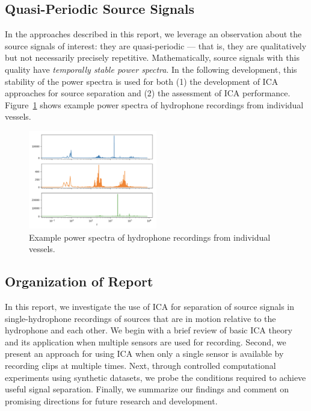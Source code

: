\documentclass[10pt]{article}
\begin{document}
\subsection*{Quasi-Periodic Source Signals}
In the approaches described in this report, we leverage an observation about the source
signals of interest: they are quasi-periodic --- that is, they are qualitatively but not
necessarily precisely repetitive. Mathematically, source signals with this quality have
\emph{temporally stable power spectra}. In the following development, this stability of the
power spectra is used for both (1) the development of ICA approaches for source separation
and (2) the assessment of ICA performance. Figure~\ref{fig:power-spectra-examples} shows
example power spectra of hydrophone recordings from individual vessels.
\begin{figure}[ht]
    \centering
    \includegraphics[width=0.5\textwidth]{power-spectra-examples}
    \caption{\label{fig:power-spectra-examples}
        Example power spectra of hydrophone recordings from individual vessels.
    }
\end{figure}

\subsection*{Organization of Report}
In this report, we investigate the use of ICA for separation of source signals in
single-hydrophone recordings of sources that are in motion relative to the hydrophone and
each other. We begin with a brief review of basic ICA theory and its application when
multiple sensors are used for recording. Second, we present an approach for using ICA when
only a single sensor is available by recording clips at multiple times. Next, through
controlled computational experiments using synthetic datasets, we probe the conditions
required to achieve useful signal separation. Finally, we summarize our findings and
comment on promising directions for future research and development.
\end{document}
